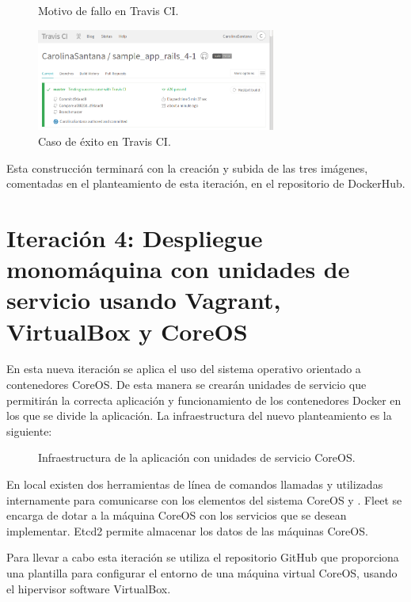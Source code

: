 \begin{figure}[H]
\centering
{}
\caption{Motivo de fallo en Travis CI.}
\end{figure}

\begin{figure}[H]
\centering
\includegraphics[width=0.7\textwidth]{images/figures/travissuccess2.png}
\caption{Caso de éxito en Travis CI.}
\end{figure}

Esta construcción terminará con la creación y subida de las tres imágenes, comentadas en el planteamiento de esta iteración, en el repositorio de DockerHub.

\section[Iteración 4: Despliegue en VirtualBox]{Iteración 4: Despliegue monomáquina con unidades de servicio usando Vagrant, VirtualBox y CoreOS}

En esta nueva iteración se aplica el uso del sistema operativo orientado a contenedores CoreOS. De esta manera se crearán unidades de servicio  que permitirán la correcta aplicación y funcionamiento de los contenedores Docker en los que se divide la aplicación. La infraestructura del nuevo planteamiento es la siguiente:

\begin{figure}[H] 
\centering
{}
\caption{Infraestructura de la aplicación con unidades de servicio CoreOS.\label{fig:coreosdiagram}}
\end{figure}

En local existen dos herramientas de línea de comandos llamadas  y  utilizadas internamente para comunicarse con los elementos del sistema CoreOS  y . Fleet se encarga de dotar a la máquina CoreOS con los servicios que se desean implementar. Etcd2 permite almacenar los datos de las máquinas CoreOS.

Para llevar a cabo esta iteración se utiliza el repositorio GitHub  que proporciona una plantilla  para configurar el entorno de una máquina virtual CoreOS, usando el hipervisor software VirtualBox.

